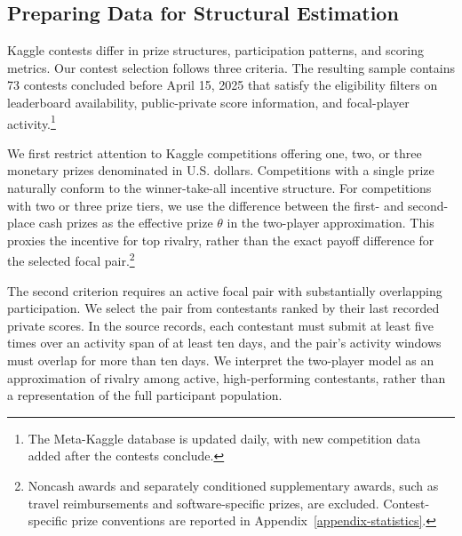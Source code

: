 \documentclass[mnsc]{informs3}
\begin{document}
\subsection{Preparing Data for Structural Estimation}
\label{sec-data-clean}

Kaggle contests differ in prize structures, participation patterns, and scoring metrics. Our contest selection follows three criteria.
The resulting sample contains 73 contests concluded before April 15, 2025 that satisfy the eligibility filters on leaderboard availability, public-private score information, and focal-player activity.\footnote{
The Meta-Kaggle database is updated daily, with new competition data added after the contests conclude.
}

We {first} restrict attention to Kaggle competitions offering one, two, or three monetary prizes denominated in U.S. dollars.
Competitions with a single prize naturally conform to the winner-take-all incentive structure.
For competitions with two or three prize tiers, we use the difference between the first- and second-place cash prizes as the effective prize $\theta$ in the two-player approximation. This proxies the incentive for top rivalry, rather than the exact payoff difference for the selected focal pair.\footnote{Noncash awards and separately conditioned supplementary awards, such as travel reimbursements and software-specific prizes, are excluded. Contest-specific prize conventions are reported in Appendix~\ref{appendix-statistics}.}

{The second criterion requires an active focal pair with substantially overlapping participation. We select the pair from contestants ranked by their last recorded private scores.}
In the source records, each contestant must submit at least five times over an activity span of at least ten days, and the pair's activity windows must overlap for more than ten days.
We interpret the two-player model as an approximation of rivalry among active, high-performing contestants, rather than a representation of the full participant population.
\end{document}
